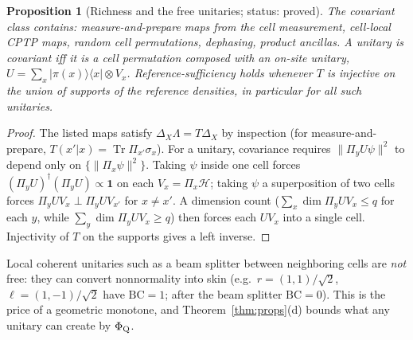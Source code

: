 \documentclass[11pt]{article}
\newtheorem{proposition}{Proposition}
\newcommand{\Tr}{\operatorname{Tr}}
\newcommand{\id}{\mathbf{1}}
\newcommand{\PhiQ}{\Phi_{\rm Q}}
\newcommand{\BC}{\mathrm{BC}}
\begin{document}
\begin{proposition}[Richness and the free unitaries; status: proved]\label{prop:unitary}
The covariant class contains: measure-and-prepare maps from the cell measurement, cell-local CPTP maps, random cell permutations, dephasing, product ancillas. A unitary is covariant iff it is a cell permutation composed with an on-site unitary, $U=\sum_x|\pi(x)\rangle\langle x|\otimes V_x$. Reference-sufficiency holds whenever $T$ is injective on the union of supports of the reference densities, in particular for all such unitaries.
\end{proposition}
\begin{proof}
The listed maps satisfy $\Delta_X\Lambda=T\Delta_X$ by inspection (for measure-and-prepare, $T(x'|x)=\Tr\Pi_{x'}\sigma_x$). For a unitary, covariance requires $\|\Pi_yU\psi\|^2$ to depend only on $\{\|\Pi_x\psi\|^2\}$. Taking $\psi$ inside one cell forces $(\Pi_yU)^\dagger(\Pi_yU)\propto\id$ on each $V_x=\Pi_x\mathcal H$; taking $\psi$ a superposition of two cells forces $\Pi_yUV_x\perp\Pi_yUV_{x'}$ for $x\neq x'$. A dimension count ($\sum_x\dim\Pi_yUV_x\le q$ for each $y$, while $\sum_y\dim\Pi_yUV_x\ge q$) then forces each $UV_x$ into a single cell. Injectivity of $T$ on the supports gives a left inverse.
\end{proof}
\noindent Local coherent unitaries such as a beam splitter between neighboring cells are \emph{not} free: they can convert nonnormality into skin (e.g.\ $r=(1,1)/\sqrt2$, $\ell=(1,-1)/\sqrt2$ have $\BC=1$; after the beam splitter $\BC=0$). This is the price of a geometric monotone, and Theorem~\ref{thm:props}(d) bounds what any unitary can create by $\PhiQ$.
\end{document}
